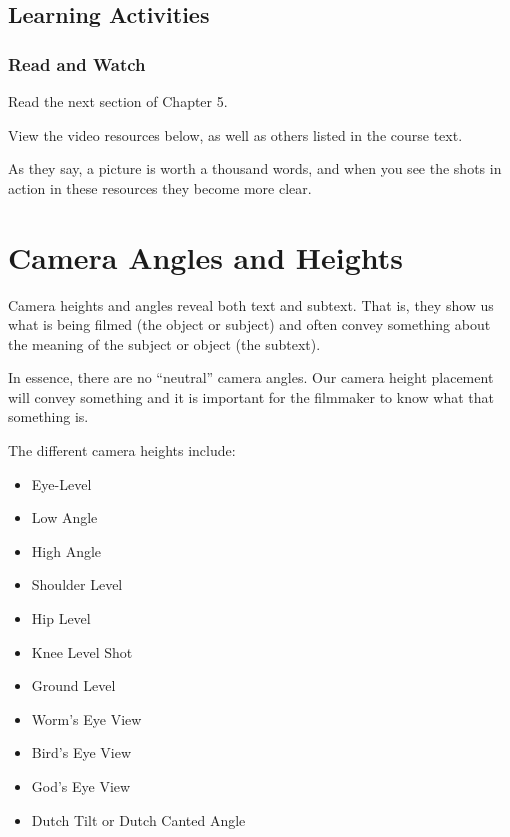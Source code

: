 \documentclass[
]{book}
\providecommand{\tightlist}{%
  \setlength{\itemsep}{0pt}\setlength{\parskip}{0pt}}
\begin{document}
\hypertarget{learning-activities-15}{%
\subsection*{Learning Activities}\label{learning-activities-15}}

\begin{reflect}
\hypertarget{read-and-watch}{%
\subsubsection*{Read and Watch}\label{read-and-watch}}

Read the next section of Chapter 5.

View the video resources below, as well as others listed in the course text.

As they say, a picture is worth a thousand words, and when you see the shots in action in these resources they become more clear.
\end{reflect}

\hypertarget{camera-angles-and-heights}{%
\section{Camera Angles and Heights}\label{camera-angles-and-heights}}

Camera heights and angles reveal both text and subtext. That is, they show us what is being filmed (the object or subject) and often convey something about the meaning of the subject or object (the subtext).

In essence, there are no ``neutral'' camera angles. Our camera height placement will convey something and it is important for the filmmaker to know what that something is.

The different camera heights include:

\begin{itemize}
\tightlist
\item
  Eye-Level\\
\item
  Low Angle\\
\item
  High Angle\\
\item
  Shoulder Level\\
\item
  Hip Level\\
\item
  Knee Level Shot\\
\item
  Ground Level\\
\item
  Worm's Eye View\\
\item
  Bird's Eye View\\
\item
  God's Eye View\\
\item
  Dutch Tilt or Dutch Canted Angle
\end{itemize}
\end{document}
